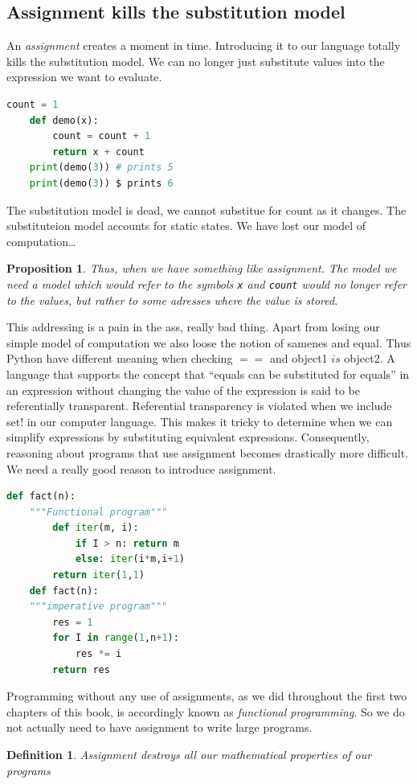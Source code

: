 \documentclass[a4paper,twoside]{article}
\newtheorem{proposition}[theorem]{Proposition}
\newtheorem{definition}[theorem]{Definition}
\numberwithin{equation}{section}
\begin{document}
\subsection{Assignment kills the substitution model}
An \textit{assignment} creates a moment in time. Introducing it to our language totally kills the substitution model. We can no longer just substitute values into
the expression we want to evaluate.
\begin{lstlisting}[language=Python]
    count = 1
    def demo(x):
        count = count + 1
        return x + count
    print(demo(3)) # prints 5
    print(demo(3)) $ prints 6
\end{lstlisting}
The substitution model is dead, we cannot substitue for count as it changes. The substituteion model accounts
for static states. We have lost our model of computation\dots
\begin{proposition}
    Thus, when we have something like assignment. The model we need a model which would refer to the
    symbols \texttt{x} and \texttt{count} would no longer refer to the values, but rather to some
    adresses where the value is stored.
\end{proposition}
This addressing is a pain in the ass, really bad thing. Apart from losing our simple model of computation
we also loose the notion of samenes and equal. Thus Python have different meaning when checking $==$
and object1 $ is$ object2. A language that supports the concept that “equals can be substituted for
equals” in an expression without changing the value of the expression is said to be referentially
transparent. Referential transparency is violated when we include set! in our computer language.
This makes it tricky to determine when we can simplify expressions by substituting equivalent
expressions. Consequently, reasoning about programs that use assignment becomes drastically
more diﬃcult. We need a really good reason to introduce assignment.
\begin{lstlisting}[language=Python]
    def fact(n):
    """Functional program"""
        def iter(m, i):
            if I > n: return m
            else: iter(i*m,i+1)
        return iter(1,1)
    def fact(n):
    """imperative program"""
        res = 1
        for I in range(1,n+1):
            res *= i
        return res
\end{lstlisting}
Programming without any use of assignments, as we did throughout
the first two chapters of this book, is accordingly known as \textit{functional programming}.
So we do not actually need to have assignment to write large programs.
\begin{definition}
    Assignment destroys all our mathematical properties of our programs
\end{definition}
\end{document}
